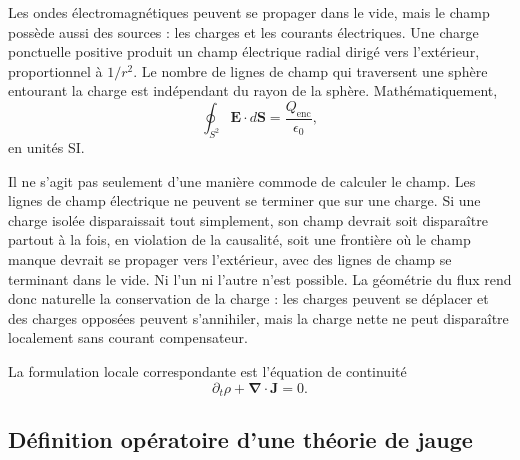 Les ondes électromagnétiques peuvent se propager dans le vide, mais le champ possède aussi des sources : les charges et les courants électriques. Une charge ponctuelle positive produit un champ électrique radial dirigé vers l’extérieur, proportionnel à \(1/r^2\). Le nombre de lignes de champ qui traversent une sphère entourant la charge est indépendant du rayon de la sphère. Mathématiquement,
\begin{equation}
\oint_{S^2}\boldsymbol E\cdot d\boldsymbol S
=\frac{Q_{\mathrm{enc}}}{\epsilon_0},
\label{eq:l5-gauss}
\end{equation}
en unités SI.

Il ne s’agit pas seulement d’une manière commode de calculer le champ. Les lignes de champ électrique ne peuvent se terminer que sur une charge. Si une charge isolée disparaissait tout simplement, son champ devrait soit disparaître partout à la fois, en violation de la causalité, soit une frontière où le champ manque devrait se propager vers l’extérieur, avec des lignes de champ se terminant dans le vide. Ni l’un ni l’autre n’est possible. La géométrie du flux rend donc naturelle la conservation de la charge : les charges peuvent se déplacer et des charges opposées peuvent s’annihiler, mais la charge nette ne peut disparaître localement sans courant compensateur.

La formulation locale correspondante est l’équation de continuité
\begin{equation}
\partial_t\rho+\boldsymbol\nabla\cdot\boldsymbol J=0.
\label{eq:l5-continuity}
\end{equation}

\subsection{Définition opératoire d’une théorie de jauge}

